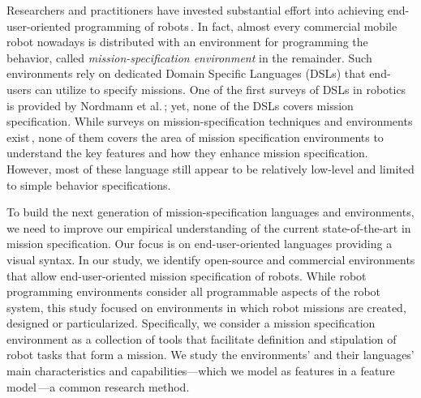 

Researchers and practitioners have invested substantial effort into achieving end-user-oriented programming of robots\,\cite{Weintrop2018,Biggs2003,Bozhinoski2016b,Arts2010,Nordmann2016a}. In fact, almost every commercial mobile robot nowadays is distributed with an environment for programming the behavior, called \emph{mission-specification environment} in the remainder. Such environments rely on dedicated Domain Specific Languages (DSLs) that end-users can utilize to specify missions.
One of the first surveys of DSLs in robotics is provided by Nordmann et al.\,\cite{Nordmann2014,Nordmann2016a}; yet, none of the DSLs covers mission specification. While surveys on mission-specification techniques and environments exist\,\cite{Biggs2003,Bravo2018,Luckcuck2018},
none of them covers the area of mission specification environments to understand the key features and how they enhance mission specification. However, most of these language still appear to be relatively low-level and limited to simple behavior specifications.

To build the next generation of mission-specification languages and environments, we need to improve our empirical understanding of the current state-of-the-art in mission specification. Our focus is on end-user-oriented languages providing a visual syntax. In our study, we identify open-source and commercial environments that allow end-user-oriented mission specification of robots. While robot programming environments consider all programmable aspects of the robot system, this study focused on environments in which robot missions are created, designed or particularized. Specifically, we consider a mission specification environment as a collection of tools that facilitate definition and stipulation of robot tasks that form a mission. We study the environments' and their languages' main characteristics and capabilities---which we model as features in a feature model\,\cite{kang.ea:1990:foda,damir2019principles}---a common research method. %

